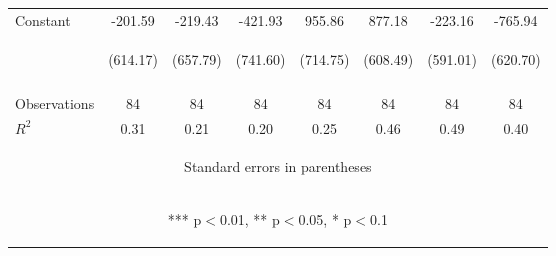 \begin{center}
\begin{tabular}{lccccccc}
Constant & -201.59 & -219.43 & -421.93 & 955.86 & 877.18 & -223.16 & -765.94 \\
 & \begin{footnotesize}(614.17)\end{footnotesize} & \begin{footnotesize}(657.79)\end{footnotesize} & \begin{footnotesize}(741.60)\end{footnotesize} & \begin{footnotesize}(714.75)\end{footnotesize} & \begin{footnotesize}(608.49)\end{footnotesize} & \begin{footnotesize}(591.01)\end{footnotesize} & \begin{footnotesize}(620.70)\end{footnotesize} \\
\vspace{4pt} & \begin{footnotesize}\end{footnotesize} & \begin{footnotesize}\end{footnotesize} & \begin{footnotesize}\end{footnotesize} & \begin{footnotesize}\end{footnotesize} & \begin{footnotesize}\end{footnotesize} & \begin{footnotesize}\end{footnotesize} & \begin{footnotesize}\end{footnotesize} \\
Observations & 84 & 84 & 84 & 84 & 84 & 84 & 84 \\
 $R^2$ & 0.31 & 0.21 & 0.20 & 0.25 & 0.46 & 0.49 & 0.40 \\ \hline
\multicolumn{8}{c}{\begin{footnotesize} Standard errors in parentheses\end{footnotesize}} \\
\multicolumn{8}{c}{\begin{footnotesize} *** p$<$0.01, ** p$<$0.05, * p$<$0.1\end{footnotesize}} \\
\end{tabular}
\end{center}
